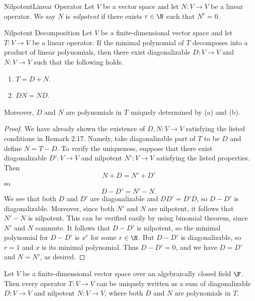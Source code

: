 \documentclass[linearalgebraII]{subfiles}
\begin{document}
    \begin{definition}{Nilpotent}{Linear Operator}
        Let $V$ be a vector space and let $N:V\to V$ be a linear operator. We say $N$ is \emph{nilpotent} if there exists $r\in \N$ such that $N^r = 0$. 
    \end{definition}

    \begin{theorem}{Nilpotent Decomposition}
        Let $V$ be a finite-dimensional vector space and let $T:V\to V$ be a linear operator. If the minimal polynomial of $T$ decomposes into a product of linear polynomials, then there exist diagonalizable $D:V\to V$ and $N:V\to V$ such that the following holds.
        \begin{enumerate}
            \item $T = D+N$.
            \item $DN = ND$.
        \end{enumerate}
        Moreover, $D$ and $N$ are polynomials in $T$ uniquely determined by (a) and (b).
    \end{theorem}

    \begin{proof}
        We have already shown the existence of $D, N:V\to V$ satisfying the listed conditions in Remark 2.17. Namely, take diagonalizable part of $T$ to be $D$ and define $N = T-D$. To verify the uniqueness, suppose that there exist diagonalizable $D':V\to V$ and nilpotent $N':V\to V$ satisfying the listed properties. Then
        \begin{equation*}
            N + D = N' + D'
        \end{equation*}
        so
        \begin{equation*}
            D - D' = N' - N.
        \end{equation*}
        We see that both $D$ and $D'$ are diagonalizable and $DD' = D'D$, so $D-D'$ is diagonalizable. Moreover, since both $N'$ and $N$ are nilpotent, it follows that $N'-N$ is nilpotent. This can be verified easily by using binomial theorem, since $N'$ and $N$ commute. It follows that $D-D'$ is nilpotent, so the minimal polynomial for $D-D'$ is $x^r$ for some $r\in \N$. But $D-D'$ is diagonalizable, so $r=1$ and $x$ is its minimal polynomial. Thus $D-D'=0$, and we have $D=D'$ and
        $N=N'$, as desired. 
    \end{proof}

    \begin{cor}{}
        Let $V$ be a finite-dimensional vector space over an algebraically closed field $\F$. Then every operator $T:V\to V$ can be uniquely written as a sum of diagonalizable $D:V\to V$ and nilpotent $N:V\to V$, where both $D$ and $N$ are polynomials in $T$.
    \end{cor}	
\end{document}

